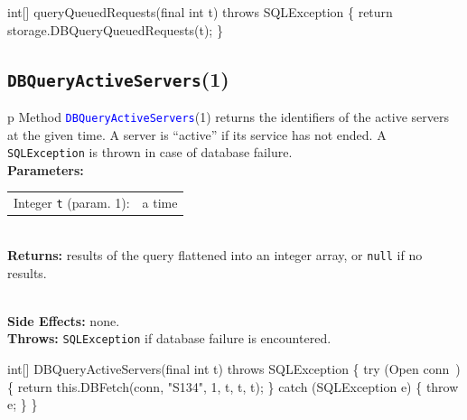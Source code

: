 \nwenddocs{}\endmoddef{}
int[] queryQueuedRequests(final int t) throws SQLException \{
  return storage.DBQueryQueuedRequests(t);
\}
\eatline
{}\nwendcode{}\nwdocspar
\subsection{\texttt{DBQueryActiveServers}(1)}
\begin{tabular}{p{\textwidth}}
\toprule
{}
Method \textcolor{blue}{{\tt{}\protect{}DBQueryActiveServers}}(1) returns the identifiers
of the active servers at the given time. A server is ``active'' if its
service has not ended.
A {\tt{}SQLException} is thrown in case of database failure.\\
\midrule
\textbf{Parameters:} \\
\begin{tabular}{lp{116mm}}
Integer {\tt{}t} (param. 1):&a time
\end{tabular}\\
\textbf{Returns:} results of the query flattened into an integer array, or
{\tt{}null} if no results.

\\
\textbf{Side Effects:} none.\\
\textbf{Throws:} {\tt{}SQLException} if database failure is encountered.\\
\bottomrule
\end{tabular}
\nwenddocs{}\endmoddef{}
int[] DBQueryActiveServers(final int t) throws SQLException \{
  try (\LA{}Open \code{}conn\edoc{}~{\nwtagstyle{}}\RA{}) \{
    return this.DBFetch(conn, "S134", 1, t, t, t);
  \} catch (SQLException e) \{
    throw e;
  \}
\}
\eatline
{}\nwendcode{}\nwdocspar
